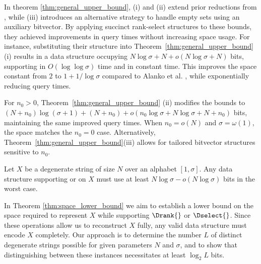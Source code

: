 \noindent In theorem \ref{thm:general_upper_bound}, (i) and (ii) extend prior reductions from \cite{alanko2023small}, while (iii) introduces an alternative strategy to handle empty sets using an auxiliary bitvector. By applying succinct rank-select structures to these bounds, they achieved improvements in query times without increasing space usage. For instance, substituting their structure into Theorem~\ref{thm:general_upper_bound} (i) results in a data structure occupying $N\log\sigma + N + o(N\log\sigma + N)$ bits, supporting \Drank{} in $O(\log\log\sigma)$ time and \Dselect{} in constant time. This improves the space constant from $2$ to $1 + 1/\log\sigma$ compared to Alanko et al. \cite{SubsetWT}, while exponentially reducing query times. \vspace{1em}

\noindent For $n_0 > 0$, Theorem~\ref{thm:general_upper_bound} (ii) modifies the bounds to $(N+n_0)\log(\sigma+1) + (N+n_0) + o(n_0\log\sigma + N\log\sigma + N + n_0)$ bits, maintaining the same improved query times. When $n_0 = o(N)$ and $\sigma = \omega(1)$, the space matches the $n_0=0$ case. Alternatively, Theorem~\ref{thm:general_upper_bound}(iii) allows for tailored bitvector structures sensitive to $n_0$.

\begin{theorem}
    \label{thm:space_lower_bound}
    Let $X$ be a degenerate string of size $N$ over an alphabet $[1,\sigma]$. Any data structure supporting \Drank{} or \Dselect{} on $X$ must use at least $N\log \sigma - o(N\log \sigma)$ bits in the worst case.
\end{theorem}

\noindent In Theorem \ref{thm:space_lower_bound} we aim to establish a lower bound on the space required to represent $X$ while supporting $\Drank{}$ or $\Dselect{}$. Since these operations allow us to reconstruct $X$ fully, any valid data structure must encode $X$ completely. Our approach is to determine the number $L$ of distinct degenerate strings possible for given parameters $N$ and $\sigma$, and to show that distinguishing between these instances necessitates at least $\log_2 L$ bits.

